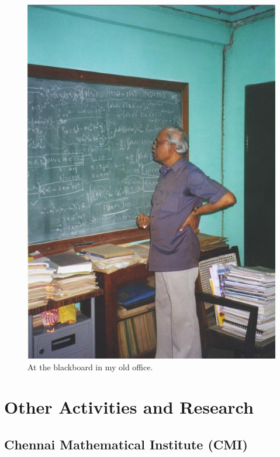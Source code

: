 \begin{figure}[h]
\centering
\includegraphics[width=\textwidth]{images/rajaji1.jpg}
\caption{At the blackboard in my old office.}
\end{figure}


\chapter{Other Activities and Research}

\section*{Chennai Mathematical Institute (CMI)}


